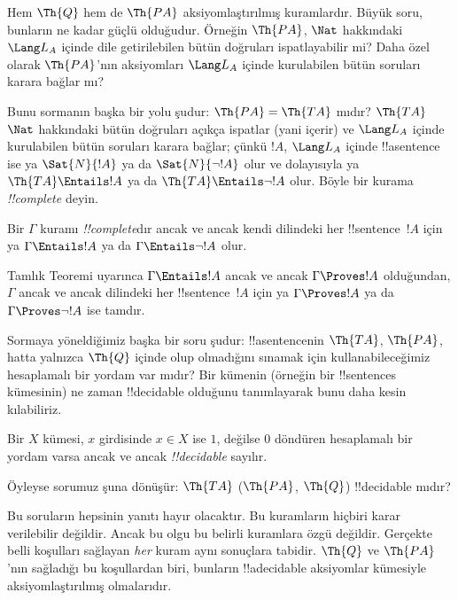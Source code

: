 \documentclass[../../../include/open-logic-section]{subfiles}
\begin{document}
Hem $\Th{Q}$ hem de $\Th{PA}$ aksiyomlaştırılmış kuramlardır. Büyük soru,
bunların ne kadar güçlü olduğudur. Örneğin $\Th{PA}$, $\Nat$ hakkındaki
$\Lang L_A$ içinde dile getirilebilen bütün doğruları ispatlayabilir mi?
Daha özel olarak $\Th{PA}$'nın aksiyomları $\Lang L_A$ içinde kurulabilen
bütün soruları karara bağlar mı?

Bunu sormanın başka bir yolu şudur: $\Th{PA} = \Th{TA}$ mıdır? $\Th{TA}$
$\Nat$ hakkındaki bütün doğruları açıkça ispatlar (yani içerir) ve
$\Lang L_A$ içinde kurulabilen bütün soruları karara bağlar; çünkü $!A$,
$\Lang L_A$ içinde !!a{sentence} ise ya $\Sat{N}{!A}$ ya da
$\Sat{N}{\lnot !A}$ olur ve dolayısıyla ya $\Th{TA} \Entails !A$ ya da
$\Th{TA} \Entails \lnot !A$ olur. Böyle bir kurama \emph{!!{complete}}
deyin.

\begin{defn}
Bir $\Gamma$ kuramı \emph{!!{complete}}dır ancak ve ancak kendi dilindeki
her !!{sentence}~$!A$ için ya $\Gamma \Entails !A$ ya da
$\Gamma \Entails \lnot !A$ olur.
\end{defn}

\begin{explain}
Tamlık Teoremi uyarınca $\Gamma \Entails !A$ ancak ve ancak
$\Gamma \Proves !A$ olduğundan, $\Gamma$ ancak ve ancak dilindeki her
!!{sentence}~$!A$ için ya $\Gamma \Proves !A$ ya da
$\Gamma \Proves \lnot !A$ ise tamdır.
\end{explain}

Sormaya yöneldiğimiz başka bir soru şudur: !!a{sentence}{}nin $\Th{TA}$,
$\Th{PA}$, hatta yalnızca $\Th{Q}$ içinde olup olmadığını sınamak için
kullanabileceğimiz hesaplamalı bir yordam var mıdır? Bir kümenin (örneğin
bir !!{sentence}s kümesinin) ne zaman !!{decidable} olduğunu tanımlayarak
bunu daha kesin kılabiliriz.

\begin{defn}
Bir $X$ kümesi, $x$ girdisinde $x \in X$ ise $1$, değilse $0$ döndüren
hesaplamalı bir yordam varsa ancak ve ancak \emph{!!{decidable}} sayılır.
\end{defn}

Öyleyse sorumuz şuna dönüşür: $\Th{TA}$ ($\Th{PA}$, $\Th{Q}$)
!!{decidable} mıdır?

Bu soruların hepsinin yanıtı hayır olacaktır. Bu kuramların hiçbiri karar
verilebilir değildir. Ancak bu olgu bu belirli kuramlara özgü değildir.
Gerçekte belli koşulları sağlayan \emph{her} kuram aynı sonuçlara tabidir.
$\Th{Q}$ ve $\Th{PA}$'nın sağladığı bu koşullardan biri, bunların
!!a{decidable} aksiyomlar kümesiyle aksiyomlaştırılmış olmalarıdır.
\end{document}
